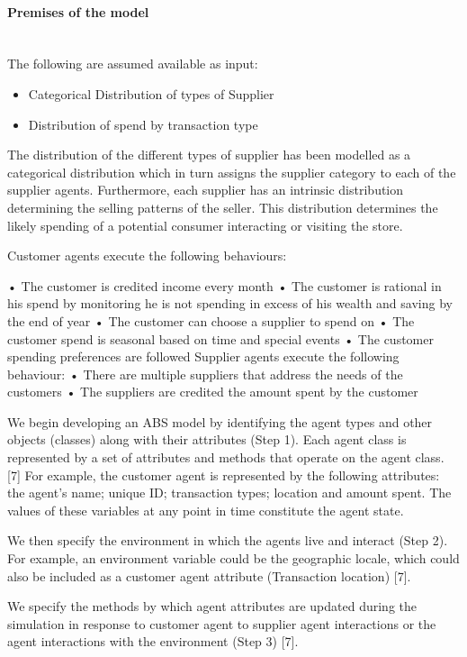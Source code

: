 \documentclass[]{article}
\begin{document}
\paragraph{Premises of the model}\\
The following are assumed available as input:
\begin{itemize}
    \item Categorical Distribution of
types of Supplier
    \item Distribution of spend by transaction type
\end{itemize}

The distribution of the different types of supplier has been modelled as
a categorical distribution which in turn assigns the supplier category
to each of the supplier agents. Furthermore, each supplier has an
intrinsic distribution determining the selling patterns of the seller.
This distribution determines the likely spending of a potential consumer
interacting or visiting the store.

Customer agents execute the following behaviours:

• The customer is credited income every month • The customer is rational
in his spend by monitoring he is not spending in excess of his wealth
and saving by the end of year • The customer can choose a supplier to
spend on • The customer spend is seasonal based on time and special
events • The customer spending preferences are followed Supplier agents
execute the following behaviour: • There are multiple suppliers that
address the needs of the customers • The suppliers are credited the
amount spent by the customer

We begin developing an ABS model by identifying the agent types and
other objects (classes) along with their attributes (Step 1). Each agent
class is represented by a set of attributes and methods that operate on
the agent class. {[}7{]} For example, the customer agent is represented
by the following attributes: the agent's name; unique ID; transaction
types; location and amount spent. The values of these variables at any
point in time constitute the agent state.

We then specify the environment in which the agents live and interact
(Step 2). For example, an environment variable could be the geographic
locale, which could also be included as a customer agent attribute
(Transaction location) {[}7{]}.

We specify the methods by which agent attributes are updated during the
simulation in response to customer agent to supplier agent interactions
or the agent interactions with the environment (Step 3) {[}7{]}.
\end{document}
